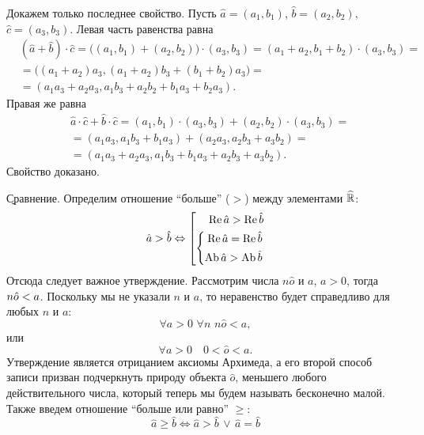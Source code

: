 Докажем только последнее свойство. Пусть $\hat{a}=(a_1, b_1)$, $\hat{b}=(a_2, b_2)$, $\hat{c}=(a_3, b_3)$. Левая часть равенства равна
\begin{eqnarray*}
	& (\hat{a}+\hat{b})\cdot\hat{c}=\big((a_1, b_1)+(a_2, b_2)\big)\cdot(a_3, b_3)=(a_1+a_2, b_1+b_2)\cdot(a_3, b_3)= \\
	& =\big((a_1+a_2)a_3, (a_1+a_2)b_3+(b_1+b_2)a_3\big) = \\
	& =(a_1a_3+a_2a_3, a_1b_3+a_2b_2+b_1a_3+b_2a_3).
\end{eqnarray*}
Правая же равна
\begin{eqnarray*}
	& \hat{a}\cdot\hat{c}+\hat{b}\cdot\hat{c}=(a_1, b_1)\cdot(a_3, b_3)+(a_2, b_2)\cdot(a_3, b_3)= \\
	& =(a_1a_3, a_1b_3+b_1a_3)+(a_2a_3, a_2b_3+a_3b_2)= \\
	& =(a_1a_3+a_2a_3, a_1b_3+b_1a_3+a_2b_3+a_3b_2).
\end{eqnarray*}
Свойство доказано.

\b{Сравнение.} Определим отношение ``больше'' ($>$) между элементами $\widehat{\mathbb{R}}$:
	\begin{equation}
	\hat{a}>\hat{b}
	  \Leftrightarrow
		\left[
			\begin{aligned}
				\operatorname{Re} \hat{a}>\operatorname{Re} \hat{b} \\
				\left\{
					\begin{aligned}
						\operatorname{Re} \hat{a}=\operatorname{Re} \hat{b} \\
						\operatorname{Ab}{\hat{a}}>\operatorname{Ab}{\hat{b}}
					\end{aligned}
				\right.
			\end{aligned}
		\right.
	\end{equation}
Отсюда следует важное утверждение. Рассмотрим числа $n\hat{o}$ и $a$, $a>0$, тогда $n\hat{o}\hm<a$. Поскольку мы не указали $n$ и $a$, то неравенство будет справедливо для любых $n$ и $a$:
	$$\forall a>0 \,\, \forall n \,\, n\hat{o}<a,$$
или
	\begin{equation}
		\forall a>0 \quad 0<\hat{o}<a.
	\end{equation}
Утверждение является отрицанием аксиомы Архимеда, а его второй способ записи призван подчеркнуть природу объекта $\hat{o}$, меньшего любого действительного числа, который теперь мы будем называть бесконечно малой.
Также введем отношение ``больше или равно'' $\ge$:
	\begin{equation}
	\hat{a}\ge\hat{b}\Leftrightarrow\hat{a}>\hat{b}\,\lor\,\hat{a}=\hat{b}
	\end{equation}

